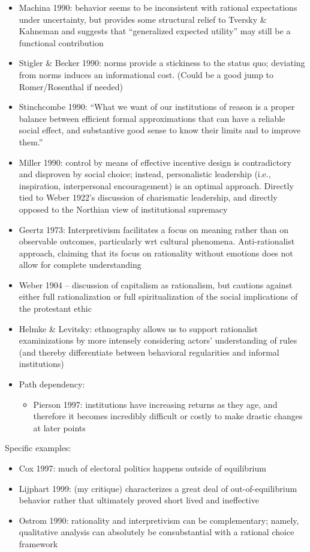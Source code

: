 \documentclass[12pt]{article}
\begin{document}
\begin{itemize}
    \item Machina 1990: behavior seems to be inconsistent with rational expectations under uncertainty, but provides some structural relief to Tversky \& Kahneman and suggests that ``generalized expected utility'' may still be a functional contribution
    \item Stigler \& Becker 1990: norms provide a stickiness to the status quo; deviating from norms induces an informational cost. (Could be a good jump to Romer/Rosenthal if needed)
    \item Stinchcombe 1990: ``What we want of our institutions of reason is a proper balance between efficient formal approximations that can have a reliable social effect, and substantive good sense to know their limits and to improve them.''
    \item Miller 1990: control by means of effective incentive design is contradictory and disproven by social choice; instead, personalistic leadership (i.e., inspiration, interpersonal encouragement) is an optimal approach. Directly tied to Weber 1922's discussion of charismatic leadership, and directly opposed to the Northian view of institutional supremacy
    \item Geertz 1973: Interpretivism facilitates a focus on meaning rather than on observable outcomes, particularly wrt cultural phenomena. Anti-rationalist approach, claiming that its focus on rationality without emotions does not allow for complete understanding
    \item Weber 1904 -- discussion of capitalism as rationalism, but cautions against either full rationalization or full spiritualization of the social implications of the protestant ethic
    \item Helmke \& Levitsky: ethnography allows us to support rationalist examinizations by more intensely considering actors' understanding of rules (and thereby differentiate between behavioral regularities and informal institutions)
    \item Path dependency:
    \begin{itemize}
        \item Pierson 1997: institutions have increasing returns as they age, and therefore it becomes incredibly difficult or costly to make drastic changes at later points
    \end{itemize}
\end{itemize}

Specific examples:

\begin{itemize}
    \item Cox 1997: much of electoral politics happens outside of equilibrium
    \item Lijphart 1999: (my critique) characterizes a great deal of out-of-equilibrium behavior rather that ultimately proved short lived and ineffective
    \item Ostrom 1990: rationality and interpretivism can be complementary; namely, qualitative analysis can absolutely be consubstantial with a rational choice framework
\end{itemize}
\end{document}
